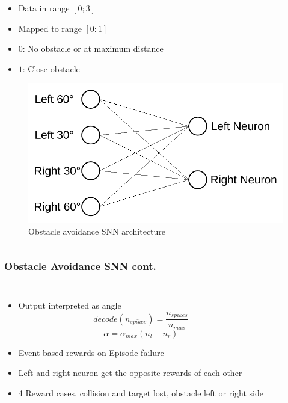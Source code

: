 \begin{frame}
\begin{columns}
\begin{overprint}
\begin{figure}
				\end{figure}
				\begin{itemize}
					\item Data in range $[0;3]$
					\item Mapped to range $[0:1]$
					\item $0$: No obstacle or at maximum distance
					\item $1$: Close obstacle
				\end{itemize}
				\begin{figure}
					\centering
					\includegraphics[width=\textwidth]{img/arch_oa.pdf}
					\caption{Obstacle avoidance SNN architecture}
					\label{fig:arch_oa}
				\end{figure}
			\end{overprint}
	\end{columns}
\end{frame}

\begin{frame}
	\frametitle{Obstacle Avoidance SNN cont.}
	\begin{columns}
		\column{\linewidth}
			\begin{itemize}
				\item <1-> Output interpreted as angle
				\[decode\left(n_{spikes}\right) = \frac{n_{spikes}}{n_{max}}\]
				\[\alpha = \alpha_{max} \left(n_l - n_r\right)\]
				\item <2-> Event based rewards on Episode failure
				\item <2-> Left and right neuron get the opposite rewards of each other
				\item <2-> 4 Reward cases, collision and target lost, obstacle left or right side
			\end{itemize}			
	\end{columns}
\end{frame}

